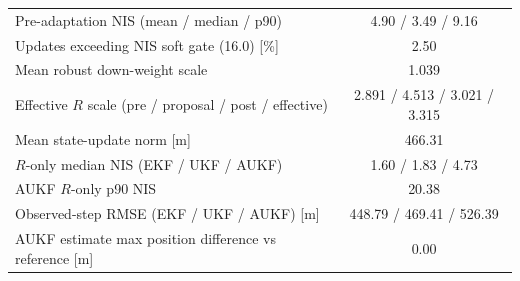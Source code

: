 \begin{table}[t]
{\begin{tabular}{lcc}
    Pre-adaptation NIS (mean / median / p90) & \multicolumn{2}{c}{4.90 / 3.49 / 9.16} \\
    Updates exceeding NIS soft gate (16.0) [\%] & \multicolumn{2}{c}{2.50} \\
    Mean robust down-weight scale & \multicolumn{2}{c}{1.039} \\
    Effective $R$ scale (pre / proposal / post / effective) & \multicolumn{2}{c}{2.891 / 4.513 / 3.021 / 3.315} \\
    Mean state-update norm [m] & \multicolumn{2}{c}{466.31} \\
    $R$-only median NIS (EKF / UKF / AUKF) & \multicolumn{2}{c}{1.60 / 1.83 / 4.73} \\
    AUKF $R$-only p90 NIS & \multicolumn{2}{c}{20.38} \\
    Observed-step RMSE (EKF / UKF / AUKF) [m] & \multicolumn{2}{c}{448.79 / 469.41 / 526.39} \\
    AUKF estimate max position difference vs reference [m] & \multicolumn{2}{c}{0.00} \\
    \bottomrule
  \end{tabular}
  }
\end{table}